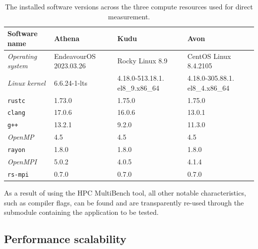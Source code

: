 \begin{table}[H]
    \caption{The installed software versions across the three compute resources used for direct measurement.}
    \label{table:compute-resource-software-versions}
    \begin{tabular}{|p{}||p{}|p{}|p{}|}
    \hline
    \textbf{Software name} & \textbf{Athena} & \textbf{Kudu} & \textbf{Avon} \\
    \hline\hline
    \textit{Operating system} & EndeavourOS 2023.03.26 & Rocky Linux 8.9                & CentOS Linux 8.4.2105          \\\hline
    \textit{Linux kernel}     & 6.6.24-1-lts                     & 4.18.0-513.18.1. el8\_9.x86\_64 & 4.18.0-305.88.1. el8\_4.x86\_64 \\\hline
    \texttt{rustc}            & 1.73.0                           & 1.75.0                         & 1.75.0                         \\\hline
    \texttt{clang}            & 17.0.6                           & 16.0.6                         & 13.0.1                         \\\hline
    \texttt{g++}              & 13.2.1                           & 9.2.0                          & 11.3.0                         \\\hline
    \textit{OpenMP}           & 4.5                              & 4.5                            & 4.5                            \\\hline
    \texttt{rayon}            & 1.8.0                            & 1.8.0                          & 1.8.0                          \\\hline
    \textit{OpenMPI}          & 5.0.2                            & 4.0.5                          & 4.1.4                          \\\hline
    \texttt{rs-mpi}           & 0.7.0                            & 0.7.0                          & 0.7.0                          \\\hline
    \end{tabular}
\end{table}

As a result of using the HPC MultiBench tool, all other notable characteristics, such as compiler flags, can be found and are transparently re-used through the submodule containing the application to be tested.

\subsection{Performance scalability}
\label{ssec:performance-scalability}

